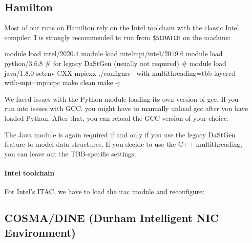 \subsection{Hamilton}

Most of our runs on Hamilton rely on the Intel toolchain with the classic Intel
compiler.
I is strongly recommended to run from \texttt{\$SCRATCH} on the machine:


\begin{code}
module load intel/2020.4
module load intelmpi/intel/2019.6
module load python/3.6.8
# for legacy DaStGen (usually not required)
# module load java/1.8.0
setenv CXX mpicxx
./configure --with-multithreading=tbb-layered --with-mpi=mpiicpc
make clean
make -j
\end{code}





\begin{remark}
 We faced issues with the Python module loading its own version of gcc.
 If you run into issues with GCC, you might have to manually unload gcc after
 you have loaded Python. After that, you can reload the GCC version of your
 choice.
\end{remark}

\noindent
The Java module is again required if and only if you use the legacy DaStGen
feature to model data structures.
If you decide to use the C++ multithreading, you can leave out the TBB-specific
settings.



\paragraph{Intel toolchain}

For Intel's ITAC, we have to load the itac module and reconfigure:



\subsection{COSMA/DINE (Durham Intelligent NIC Environment)}


